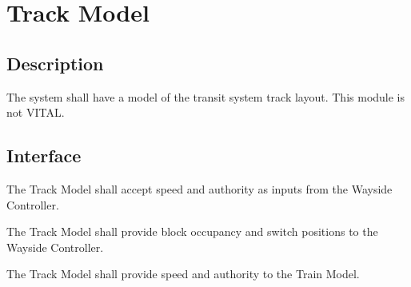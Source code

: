 \documentclass{scrreprt}
\begin{document}
\section{Track Model}

\subsection{Description}
The system shall have a model of the transit system track layout. This module is not VITAL.

\subsection{Interface}
\begin{numonly}
    \item The Track Model shall accept speed and authority as inputs from the Wayside Controller.
    \item The Track Model shall provide block occupancy and switch positions to the Wayside Controller.
    \item The Track Model shall provide speed and authority to the Train Model.
\end{numonly}
\end{document}
